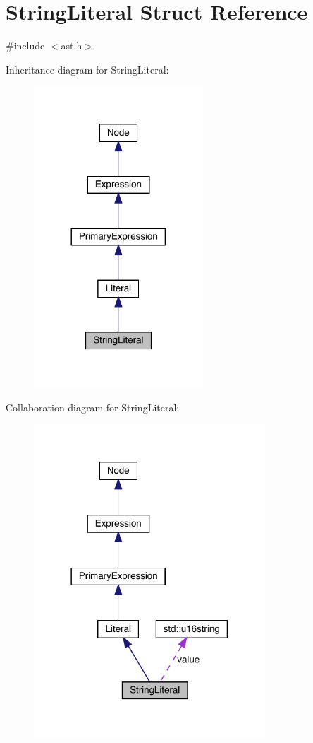 \hypertarget{struct_string_literal}{}\section{String\+Literal Struct Reference}
\label{struct_string_literal}


{\ttfamily \#include $<$ast.\+h$>$}



Inheritance diagram for String\+Literal\+:\nopagebreak
\begin{figure}[H]
\begin{center}
\leavevmode
\includegraphics[width=180pt]{struct_string_literal__inherit__graph}
\end{center}
\end{figure}


Collaboration diagram for String\+Literal\+:\nopagebreak
\begin{figure}[H]
\begin{center}
\leavevmode
\includegraphics[width=246pt]{struct_string_literal__coll__graph}
\end{center}
\end{figure}
